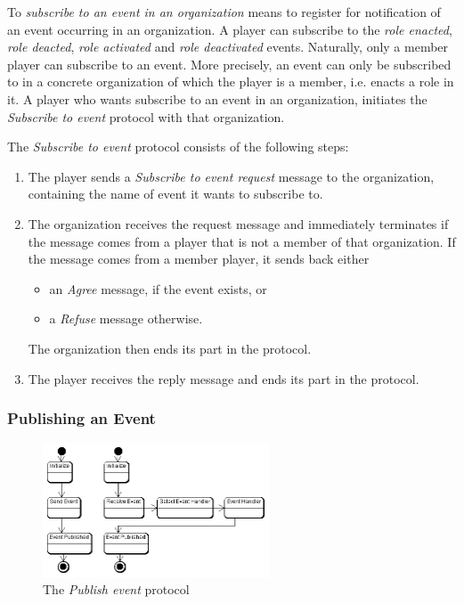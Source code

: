 To \textit{subscribe to an event in an organization} means to register for notification of an event occurring in an organization.
A player can subscribe to the \textit{role enacted}, \textit{role deacted}, \textit{role activated} and \textit{role deactivated} events.
Naturally, only a member player can subscribe to an event.
More precisely, an event can only be subscribed to in a concrete organization of which the player is a member, i.e. enacts a role in it.
A player who wants subscribe to an event in an organization, initiates the \textit{Subscribe to event} protocol with that organization.

The \textit{Subscribe to event} protocol consists of the following steps:
\begin{enumerate}
	\item The player sends a \textit{Subscribe to event request} message to the organization, containing the name of event it wants to subscribe to.
	\item The organization receives the request message and immediately terminates if the message comes from a player that is not a member of that organization.
	If the message comes from a member player, it sends back either
	\begin{itemize}
		\item an \textit{Agree} message, if the event exists, or
		\item a \textit{Refuse} message otherwise. 
	\end{itemize}
	The organization then ends its part in the protocol.
	\item The player receives the reply message and ends its part in the protocol.
\end{enumerate}

\subsubsection{Publishing an Event}

\begin{figure}[ht]
	\centering
	\includegraphics[width=0.6\textwidth]{images/thespian/publish-event-protocol}
	\caption{The \textit{Publish event} protocol}
	\label{figure:thespian-publish-event-protocol}
\end{figure}

